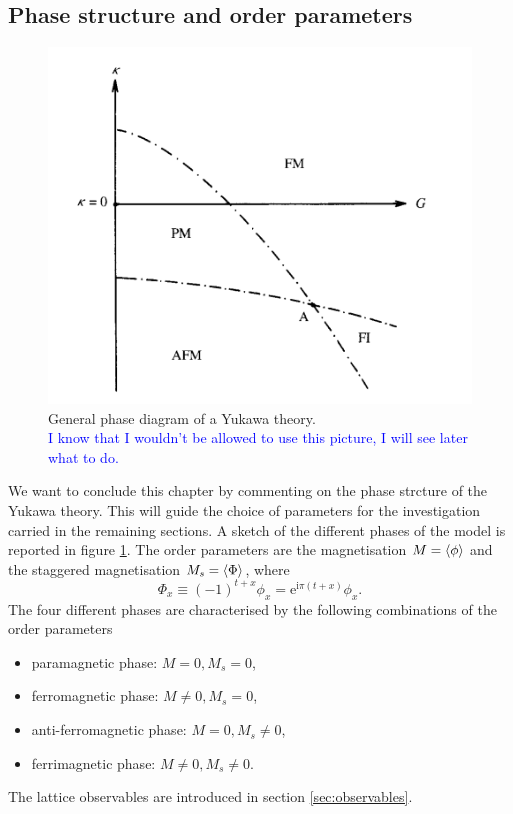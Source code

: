 \subsection{Phase structure and order parameters}
\begin{figure}
    \centering
    \includegraphics[scale=0.5]{figures/yukawa_phase_diagram.png}
    \caption[Yukawa phase diagram]{General phase diagram of a Yukawa theory. \\ \textcolor{blue}{I know that I wouldn't be allowed to use this picture, I will see later what to do.}}
    \label{fig:yukawa_phase_diagram}
\end{figure}
We want to conclude this chapter by commenting on the phase strcture of the Yukawa theory. This will guide the choice of parameters for the investigation carried in the remaining sections. A sketch of the different phases of the model is reported in figure \ref{fig:yukawa_phase_diagram}. 
The order parameters are the magnetisation $M = \left\langle \phi \right\rangle$ and the staggered magnetisation $M_s = \left\langle \Phi \right\rangle$, where
\begin{equation}
    {\Phi}_x \equiv(-1)^{t+x} \phi_x=\mathrm{e}^{\mathrm{i} \pi\left(t+x\right)} \phi_x .
\end{equation}
The four different phases are characterised by the following combinations of the order parameters
\begin{itemize}
    \item paramagnetic phase: $M = 0, M_s = 0$,
    \item ferromagnetic phase: $M \neq 0, M_s = 0$,
    \item anti-ferromagnetic phase: $M = 0, M_s \neq 0$,
    \item ferrimagnetic phase: $M \neq 0, M_s \neq 0$.
\end{itemize}
The lattice observables are introduced in section \ref{sec:observables}.